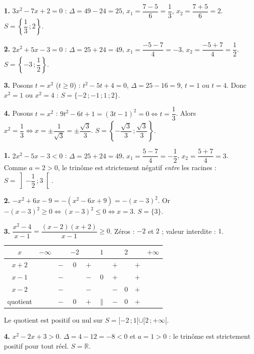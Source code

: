 \documentclass[11pt]{article}
\begin{document}
\begin{corrige}
\textbf{1.} $3x^2 - 7x + 2 = 0$ : $\Delta = 49 - 24 = 25$, $x_1 = \dfrac{7-5}{6} = \dfrac{1}{3}$, $x_2 = \dfrac{7+5}{6} = 2$. $S = \left\{\dfrac{1}{3}\,; 2\right\}$.

\textbf{2.} $2x^2 + 5x - 3 = 0$ : $\Delta = 25 + 24 = 49$, $x_1 = \dfrac{-5-7}{4} = -3$, $x_2 = \dfrac{-5+7}{4} = \dfrac{1}{2}$. $S = \left\{-3\,; \dfrac{1}{2}\right\}$.

\textbf{3.} Posons $t = x^2$ ($t \ge 0$) : $t^2 - 5t + 4 = 0$, $\Delta = 25 - 16 = 9$, $t = 1$ ou $t = 4$. Donc $x^2 = 1$ ou $x^2 = 4$ : $S = \{-2\,; -1\,; 1\,; 2\}$.

\textbf{4.} Posons $t = x^2$ : $9t^2 - 6t + 1 = (3t-1)^2 = 0 \iff t = \dfrac{1}{3}$. Alors $x^2 = \dfrac{1}{3} \iff x = \pm \dfrac{1}{\sqrt{3}} = \pm \dfrac{\sqrt{3}}{3}$. $S = \left\{-\dfrac{\sqrt{3}}{3}\,; \dfrac{\sqrt{3}}{3}\right\}$.
\end{corrige}

\begin{corrige}
\textbf{1.} $2x^2 - 5x - 3 < 0$ : $\Delta = 25 + 24 = 49$, $x_1 = \dfrac{5-7}{4} = -\dfrac{1}{2}$, $x_2 = \dfrac{5+7}{4} = 3$. Comme $a = 2 > 0$, le trinôme est strictement négatif \emph{entre} les racines : $S = \left]-\dfrac{1}{2}\,; 3\right[$.

\textbf{2.} $-x^2 + 6x - 9 = -(x^2 - 6x + 9) = -(x-3)^2$. Or $-(x-3)^2 \ge 0 \iff (x-3)^2 \le 0 \iff x = 3$. $S = \{3\}$.

\textbf{3.} $\dfrac{x^2-4}{x-1} = \dfrac{(x-2)(x+2)}{x-1} \ge 0$. Zéros : $-2$ et $2$ ; valeur interdite : $1$.
\begin{center}\begin{tabular}{|c|ccccccccc|}\hline $x$ & $-\infty$ & & $-2$ & & $1$ & & $2$ & & $+\infty$ \\ \hline $x+2$ & & $-$ & $0$ & $+$ & & $+$ & & $+$ & \\ \hline $x-1$ & & $-$ & & $-$ & $0$ & $+$ & & $+$ & \\ \hline $x-2$ & & $-$ & & $-$ & & $-$ & $0$ & $+$ & \\ \hline quotient & & $-$ & $0$ & $+$ & $\|$ & $-$ & $0$ & $+$ & \\ \hline\end{tabular}\end{center}
Le quotient est positif ou nul sur $S = [-2\,; 1[ \cup [2\,; +\infty[$.

\textbf{4.} $x^2 - 2x + 3 > 0$. $\Delta = 4 - 12 = -8 < 0$ et $a = 1 > 0$ : le trinôme est strictement positif pour tout réel. $S = \mathbb{R}$.
\end{corrige}
\end{document}
